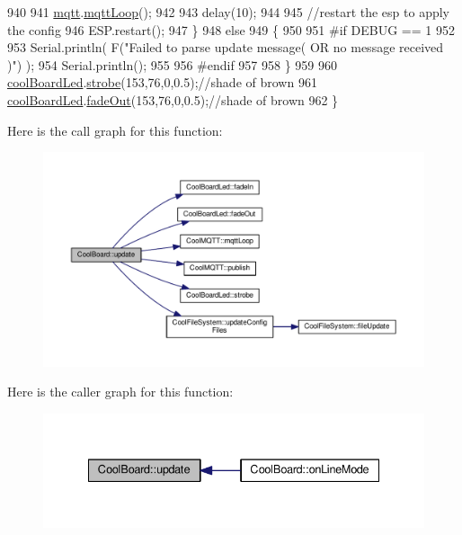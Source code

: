 \begin{DoxyCode}
940             
941             \hyperlink{classCoolBoard_a2399f44d7c23c1149a335cb3b46d90f1}{mqtt}.\hyperlink{classCoolMQTT_aa5eaae967b562b62cbcf2b8d81f6e5d5}{mqttLoop}();
942 
943             delay(10);
944             
945             \textcolor{comment}{//restart the esp to apply the config}
946             ESP.restart();
947     \}
948     \textcolor{keywordflow}{else}
949     \{
950     
951 \textcolor{preprocessor}{    #if DEBUG == 1}
952 
953         Serial.println( F(\textcolor{stringliteral}{"Failed to parse update message( OR no message received )"}) );
954         Serial.println();
955     
956 \textcolor{preprocessor}{    #endif}
957     
958     \}
959 
960     \hyperlink{classCoolBoard_a1b1d3c684a5baa56b08486e192fd8e97}{coolBoardLed}.\hyperlink{classCoolBoardLed_ad5f0de4c628cbfbf49896042831c64ad}{strobe}(153,76,0,0.5);\textcolor{comment}{//shade of brown}
961     \hyperlink{classCoolBoard_a1b1d3c684a5baa56b08486e192fd8e97}{coolBoardLed}.\hyperlink{classCoolBoardLed_a93d545679237e8cc858324367149775c}{fadeOut}(153,76,0,0.5);\textcolor{comment}{//shade of brown                              }
962 \}
\end{DoxyCode}
Here is the call graph for this function\+:
\nopagebreak
\begin{figure}[H]
\begin{center}
\leavevmode
\includegraphics[width=350pt]{classCoolBoard_a8612756d3f73198cdde857a66f0fe690_cgraph}
\end{center}
\end{figure}
Here is the caller graph for this function\+:
\nopagebreak
\begin{figure}[H]
\begin{center}
\leavevmode
\includegraphics[width=335pt]{classCoolBoard_a8612756d3f73198cdde857a66f0fe690_icgraph}
\end{center}
\end{figure}
\mbox{\label{classCoolBoard_ae7358fb6e623cfc81b775f5f1734909b}} 
